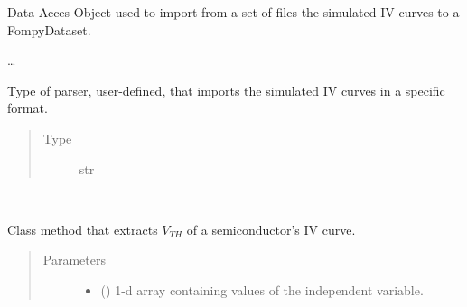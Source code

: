 \documentclass[letterpaper,10pt,english,openany, oneside]{sphinxmanual}
\begin{document}
\begin{fulllineitems}
\label{\detokenize{index:fompy.fds.daoFile}}
Data Acces Object used to import from a set of files the simulated IV curves to a FompyDataset.

…

\begin{fulllineitems}
\label{\detokenize{index:fompy.fds.daoFile.parser}}
Type of parser, user-defined, that imports the simulated IV curves in a specific format.
\begin{quote}\begin{description}
\item[{Type}] \leavevmode
str

\end{description}\end{quote}

\end{fulllineitems}


\begin{fulllineitems}
\label{\detokenize{index:fompy.fds.daoFile.load}}~

\begin{fulllineitems}
Class method that extracts \(V_{TH}\) of a semiconductor’s IV curve.

\end{fulllineitems}

\begin{quote}\begin{description}
\item[{Parameters}] \leavevmode\begin{itemize}
\item {} 
 (\sphinxstyleliteralemphasis{\sphinxupquote{, }}\sphinxstyleliteralemphasis{\sphinxupquote{ (}}\sphinxstyleliteralemphasis{\sphinxupquote{,}}\sphinxstyleliteralemphasis{\sphinxupquote{)}}) \textendash{} 1-d array containing values of the independent variable.


\end{itemize}
\end{description}
\end{quote}
\end{fulllineitems}
\end{fulllineitems}
\end{document}
